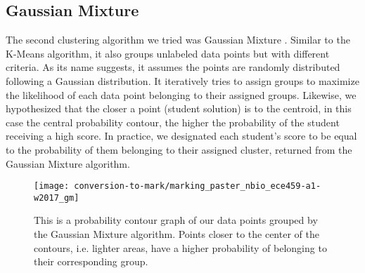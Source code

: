\subsection{Gaussian Mixture}
\label{sec:ctm-gm}

The second clustering algorithm we tried was Gaussian Mixture \cite{dempster1977maximum}. Similar to the K-Means algorithm, it also groups unlabeled data points but with different criteria. As its name suggests, it assumes the points are randomly distributed following a Gaussian distribution. It iteratively tries to assign groups to maximize the likelihood of each data point belonging to their assigned groups. Likewise, we hypothesized that the closer a point (student solution) is to the centroid, in this case the central probability contour, the higher the probability of the student receiving a high score. In practice, we designated each student's score to be equal to the probability of them belonging to their assigned cluster, returned from the Gaussian Mixture algorithm.

\begin{figure}
\texttt{[image: conversion-to-mark/marking\_paster\_nbio\_ece459-a1-w2017\_gm]}
\caption[Gaussian Mixture Clustering]{This is a probability contour graph of our data points grouped by the Gaussian Mixture algorithm. Points closer to the center of the contours, i.e. lighter areas, have a higher probability of belonging to their corresponding group.}
\label{fig:ctm-gm}
\end{figure}
